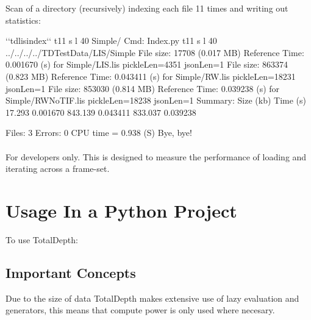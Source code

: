 \documentclass[letterpaper,10pt,english]{sphinxmanual}
\begin{document}
Scan of a directory (recursively) indexing each file 11 times and writing out statistics:

\begin{sphinxVerbatim}[commandchars=\\\{\}]
\PYGZdl{} {}`{}`tdlisindex{}`{}` \PYGZhy{}t11 \PYGZhy{}s \PYGZhy{}l 40 Simple/
Cmd: Index.py \PYGZhy{}t11 \PYGZhy{}s \PYGZhy{}l 40 ../../../../TDTestData/LIS/Simple
File size: 17708 (0.017 MB) Reference Time: 0.001670 (s) for Simple/LIS.lis pickleLen=4351 jsonLen=\PYGZhy{}1
File size: 863374 (0.823 MB) Reference Time: 0.043411 (s) for Simple/RW.lis pickleLen=18231 jsonLen=\PYGZhy{}1
File size: 853030 (0.814 MB) Reference Time: 0.039238 (s) for Simple/RW\PYGZus{}No\PYGZus{}TIF.lis pickleLen=18238 jsonLen=\PYGZhy{}1
Summary:
Size (kb)   Time (s)
17.293      0.001670
843.139     0.043411
833.037     0.039238

Files: 3
Errors: 0
CPU time =    0.938 (S)
Bye, bye!
\end{sphinxVerbatim}


\paragraph{}
\label{\detokenize{cmd_line_tools/LIS_cmd_line_tools:tdxlisrandomframesetread}}
For developers only. This is designed to measure the performance of loading and iterating across a frame-set.


\section{Usage In a Python Project}
\label{\detokenize{usage:usage-in-a-python-project}}\label{\detokenize{usage::doc}}
To use TotalDepth:

\begin{sphinxVerbatim}[commandchars=\\\{\}]
 
\end{sphinxVerbatim}


\subsection{Important Concepts}
\label{\detokenize{usage:important-concepts}}
Due to the size of data TotalDepth makes extensive use of lazy evaluation and generators, this means that compute power is only used where necesary.
\end{document}
